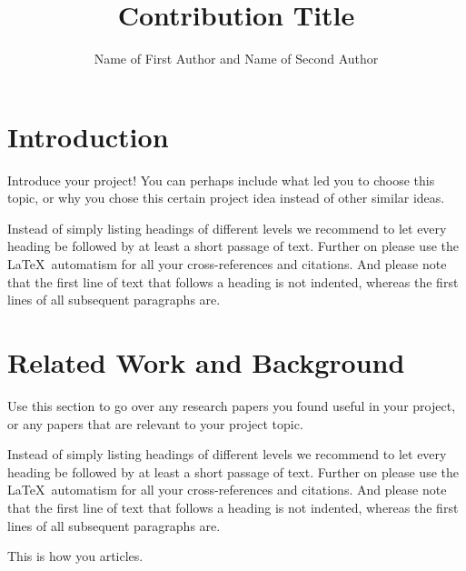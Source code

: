 \documentclass[graybox]{svmult}
\begin{document}
\title*{Contribution Title}
\author{Name of First Author and Name of Second Author}
%
%
\maketitle



\section{Introduction}
\label{sec:1}
Introduce your project! You can perhaps include what led you to choose this topic, or why you chose this certain project idea instead of other similar ideas.

Instead of simply listing headings of different levels we recommend to let every heading be followed by at least a short passage of text.  Further on please use the \LaTeX\ automatism for all your cross-references and citations. And please note that the first line of text that follows a heading is not indented, whereas the first lines of all subsequent paragraphs are.

\section{Related Work and Background}
\label{sec:2}
Use this section to go over any research papers you found useful in your project, or any papers that are relevant to your project topic.

Instead of simply listing headings of different levels we recommend to let every heading be followed by at least a short passage of text.  Further on please use the \LaTeX\ automatism for all your cross-references and citations. And please note that the first line of text that follows a heading is not indented, whereas the first lines of all subsequent paragraphs are.

This is how you \cite{slavova2022edge} articles.
\end{document}
